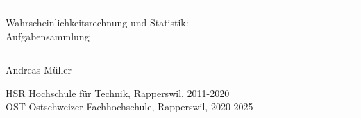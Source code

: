 \rhead{}
\frontmatter
\newcommand\HRule{\noindent\rule{\linewidth}{1.5pt}}
\begin{titlepage}
\HRule
\vspace*{2pt}
\begin{flushright}
{\Huge
Wahrscheinlichkeitsrechnung und Statistik:\\
\bigskip
Aufgabensammlung}
\end{flushright}
\HRule
\begin{flushright}
\vspace{30pt}
\LARGE
Andreas Müller
\end{flushright}
\begin{center}
HSR Hochschule für Technik, Rapperswil, 2011-2020\\
OST Ostschweizer Fachhochschule, Rapperswil, 2020-2025
\end{center}
\end{titlepage}
\hypersetup{
        linktoc=all,
        linkcolor=blue
}
\tableofcontents
